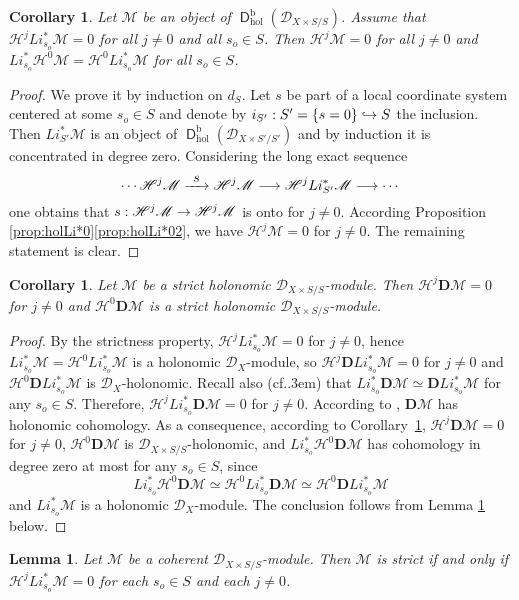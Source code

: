 \documentclass[english]{smfart}
\numberwithin{subsection}{section}
\def\shd{\mathcal{D}}\let\cD\shd
\def\shh{\mathcal{H}}
\def\shh{\mathcal{H}}
\def\shm{\mathcal{M}}
\newcommand{\bD}{\boldsymbol{D}}
\newcommand{\rb}{\mathrm{b}}
\newcommand{\hol}{\mathrm{hol}}
\newcommand{\XS}{X\times S}
\newcommand{\DXS}{\shd_{\XS/S}}
\newcommand{\DXSp}{\shd_{\XS'/S'}}
\DeclareMathOperator{\rD}{\mathsf{D}}
\def\cf{cf.\kern.3em}
\numberwithin{equation}{section}
\theoremstyle{plain}
\newtheorem{lemma}[equation]{Lemma}
\newtheorem{corollary}[equation]{Corollary}
\theoremstyle{definition}
\def\to{\mathchoice{\longrightarrow}{\rightarrow}{\rightarrow}{\rightarrow}}
\def\hto{\mathrel{\lhook\joinrel\to}}
\def\To#1{\mathchoice{\xrightarrow{\textstyle\kern4pt#1\kern3pt}}{\stackrel{#1}{\longrightarrow}}{}{}}
\begin{document}
\begin{corollary}\label{cor:Hjnul}
Let $\shm$ be an object of $\rD^\rb_\hol(\DXS)$. Assume that $\shh^j L i_{s_o}^*\shm=0$ for all $j\neq0$ and all $s_o\in S$. Then $\shh^j\shm=0$ for all $j\neq0$ and $L i^*_{s_o}\shh^0\shm=\shh^0 L i^*_{s_o}\shm$ for all $s_o\in S$.
\end{corollary}

\begin{proof}
We prove it by induction on $d_S$. Let $s$ be part of a local coordinate system centered at some $s_o\in S$ and denote by $i_{S'}:S'=\{s=0\}\hto S$ the inclusion. Then $ L i_{S'}^*\shm$ is an object of $\rD^\rb_\hol(\DXSp)$ and by induction it is concentrated in degree zero. Considering the long exact sequence
\[
\cdots\shh^j\shm\To s\shh^j\shm\to\shh^j L i_{S'}^*\shm\to\cdots
\]
one obtains that $s:\shh^j\shm\to\shh^j\shm$ is onto for $j\neq0$. According Proposition \ref{prop:holLi*0}\eqref{prop:holLi*02}, we have $\shh^j\shm=0$ for $j\neq0$. The remaining statement is clear.
\end{proof}

\begin{corollary}\label{cor:holstrict}
Let $\shm$ be a strict holonomic $\DXS$-module. Then $\shh^j\bD\shm=0$ for $j\neq0$ and $\shh^0\bD\shm$ is a strict holonomic $\DXS$-module.
\end{corollary}

\begin{proof}
By the strictness property, $\shh^jL i_{s_o}^*\shm=0$ for $j\neq0$, hence $L i_{s_o}^*\shm=\shh^0 L i_{s_o}^*\shm$ is a holonomic $\cD_X$-module, so $\shh^j\bD L i_{s_o}^*\shm=0$ for $j\neq0$ and $\shh^0\bD L i_{s_o}^*\shm$ is $\cD_X$-holonomic. Recall also (\cf \cite[Prop.\,3.1]{MF-S12}) that $L i_{s_o}^*\bD\shm\simeq \bD L i_{s_o}^*\shm$ for any $s_o\in S$. Therefore, $\shh^jL i_{s_o}^*\bD\shm=0$ for $j\neq0$. According to \hbox{\cite[Prop.\,2.5]{Sch-Sch94}}, $\bD\shm$ has holonomic cohomology. As a consequence, according to Corollary~\ref{cor:Hjnul}, $\shh^j\bD\shm=0$ for $j\neq0$, $\shh^0\bD\shm$ is $\DXS$-holonomic, and $L i^*_{s_o}\shh^0\bD\shm$ has cohomology in degree zero at most for any $s_o\in S$, since
\[
L i^*_{s_o}\shh^0\bD\shm\simeq \shh^0 L i^*_{s_o}\bD\shm\simeq\shh^0\bD L i^*_{s_o}\shm
\]
and $L i^*_{s_o}\shm$ is a holonomic $\cD_X$-module. The conclusion follows from Lemma \ref{lem:flatness} below.
\end{proof}

\begin{lemma}\label{lem:flatness}
Let $\shm$ be a coherent $\DXS$-module. Then $\shm$ is strict if and only if $\shh^j L i^*_{s_o}\shm=0$ for each $s_o\in S$ and each $j\neq0$.
\end{lemma}
\end{document}
